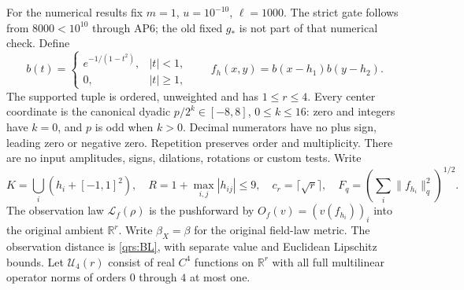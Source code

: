 \documentclass[11pt]{article}
\theoremstyle{plain}
\theoremstyle{definition}
\theoremstyle{remark}
\newcommand{\R}{\mathbb{R}}
\begin{document}
For the numerical results fix $m=1$, $u=10^{-10}$, $\ell=1000$.
The strict gate follows from $8000<10^{10}$ through AP6; the old fixed
$g_*$ is not part of that numerical check. Define
\begin{equation}\label{vqal:bumpfamily}
 b(t)=\begin{cases}e^{-1/(1-t^2)},&|t|<1,\\0,&|t|\ge1,\end{cases}
 \qquad f_h(x,y)=b(x-h_1)b(y-h_2).
\end{equation}
The supported tuple is ordered, unweighted and has $1\le r\le4$.
Every center coordinate is the canonical dyadic $p/2^k\in[-8,8]$,
$0\le k\le16$: zero and integers have $k=0$, and $p$ is odd when
$k>0$. Decimal numerators have no plus sign, leading zero or negative
zero. Repetition preserves order and multiplicity. There are no input
amplitudes, signs, dilations, rotations or custom tests. Write
\begin{equation}\label{vqal:familynorms}
 K=\bigcup_i(h_i+[-1,1]^2),\quad R=1+\max_{i,j}|h_{ij}|\le9,
 \quad c_r=\lceil\sqrt r\rceil,\quad
 F_q=\left(\sum_i\|f_{h_i}\|_q^2\right)^{1/2}.
\end{equation}
The observation law $\mathcal L_f(\rho)$ is the pushforward by
$O_f(v)=(v(f_{h_i}))_i$ into the original ambient $\R^r$.
Write $\beta_X=\beta$ for the original field-law metric.
The observation distance is \eqref{qrs:BL}, with separate value and Euclidean
Lipschitz bounds. Let $\mathcal U_4(r)$ consist of real $C^4$ functions
on $\R^r$ with all full multilinear operator norms of orders $0$ through
$4$ at most one.
\end{document}
